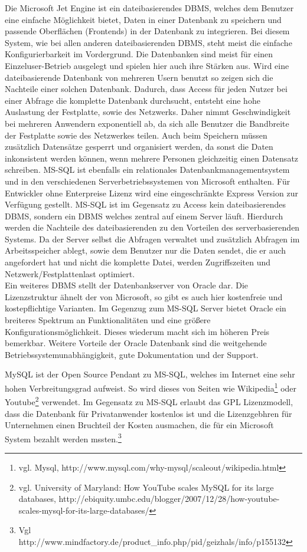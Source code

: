 Die Microsoft Jet Engine ist ein dateibasierendes DBMS, welches dem Benutzer eine einfache Möglichkeit bietet, Daten in einer Datenbank zu speichern und passende Oberflächen (Frontends) in der Datenbank zu integrieren.
Bei diesem System, wie bei allen anderen dateibasierenden DBMS, steht meist die einfache Konfigurierbarkeit im Vordergrund. Die Datenbanken sind meist für einen Einzeluser-Betrieb ausgelegt und spielen hier auch ihre Stärken aus.
Wird eine dateibasierende Datenbank von mehreren Usern benutzt so zeigen sich die Nachteile einer solchen Datenbank.
Dadurch, dass Access für jeden Nutzer bei einer Abfrage die komplette Datenbank durchsucht, entsteht eine hohe Auslastung der Festplatte, sowie des Netzwerks. Daher nimmt Geschwindigkeit bei mehreren Anwendern exponentiell ab, da sich alle Benutzer die Bandbreite der Festplatte sowie des Netzwerkes teilen.
Auch beim Speichern müssen zusätzlich Datensätze gesperrt und organisiert werden, da sonst die Daten inkonsistent werden können, wenn mehrere Personen gleichzeitig einen Datensatz schreiben.
MS-SQL ist ebenfalls ein relationales Datenbankmanagementsystem
und in den verschiedenen Serverbetriebssystemen von Microsoft enthalten. Für Entwickler
ohne Enterpreise Lizenz wird eine eingeschränkte Express Version zur Verfügung gestellt. MS-SQL ist im Gegensatz zu Access kein dateibasierendes DBMS, sondern ein DBMS welches
zentral auf einem Server läuft. Hierdurch werden die Nachteile des dateibasierenden zu
den Vorteilen des serverbasierenden Systems. Da der Server selbst die Abfragen verwaltet
und zusätzlich Abfragen im Arbeitsspeicher ablegt, sowie dem Benutzer nur die Daten
sendet, die er auch angefordert hat und nicht die komplette Datei, werden Zugriffszeiten
und Netzwerk/Festplattenlast optimiert.\\
Ein weiteres DBMS stellt der Datenbankserver von Oracle dar. Die Lizenzstruktur ähnelt der von Microsoft, so gibt es auch hier kostenfreie und kostepflichtige Varianten. Im Gegenzug zum MS-SQL Server bietet Oracle ein breiteres Spektrum an Funktionalitäten und eine größere Konfigurationsmöglichkeit. Dieses wiederum macht sich im höheren Preis bemerkbar. Weitere Vorteile der Oracle Datenbank sind die weitgehende Betriebssystemunabhängigkeit, gute Dokumentation und der Support.

MySQL ist der Open Source Pendant zu MS-SQL, welches im Internet eine sehr hohen Verbreitungsgrad aufweist.
So wird dieses von Seiten wie Wikipedia\footnote{vgl. Mysql, http://www.mysql.com/why-mysql/scaleout/wikipedia.html} oder
Youtube\footnote{vgl. University of Maryland: How YouTube scales MySQL for its large databases, http://ebiquity.umbc.edu/blogger/2007/12/28/how-youtube-scales-mysql-for-its-large-databases/} verwendet.
Im Gegensatz zu MS-SQL erlaubt das GPL Lizenzmodell, dass die Datenbank für Privatanwender kostenlos ist und die Lizenzgebhren für Unternehmen einen Bruchteil der Kosten ausmachen, die für ein Microsoft System bezahlt werden mssten.\footnote{Vgl http://www.mindfactory.de/product\_info.php/pid/geizhals/info/p155132}

